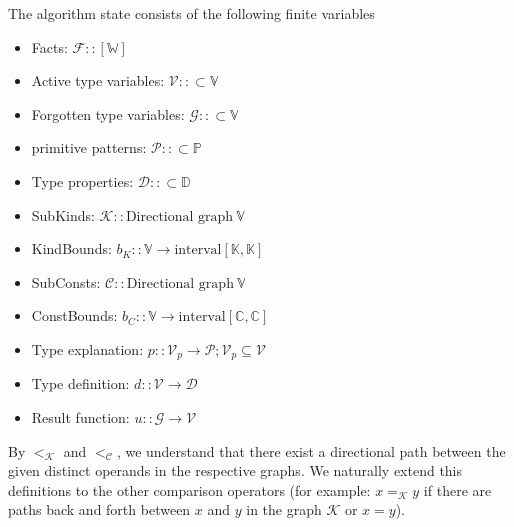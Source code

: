 \begin{defn}
    The algorithm state consists of the following finite variables
    \begin{itemize}
        \item Facts: $\mathcal{F} :: [\mathbb{W}]$
        \item Active type variables: $\mathcal{V} :: \subset \mathbb{V}$
        \item Forgotten type variables: $\mathcal{G} :: \subset \mathbb{V}$
        \item primitive patterns: $\mathcal{P} :: \subset \mathbb{P}$
        \item Type properties: $\mathcal{D} :: \subset \mathbb{D}$
        \item SubKinds: $\mathcal{K} :: \text{Directional graph}\ \mathbb{V}$
        \item KindBounds: $b_K :: \mathbb{V} \to \text{interval} \left[\mathbb{K}, \mathbb{K}\right]$
        \item SubConsts: $\mathcal{C} :: \text{Directional graph}\ \mathbb{V}$
        \item ConstBounds: $b_C :: \mathbb{V} \to \text{interval} \left[\mathbb{C}, \mathbb{C}\right]$
        \item Type explanation: $p :: \mathcal{V}_p \to \mathcal{P}; \mathcal{V}_p \subseteq \mathcal{V}$
        \item Type definition: $d :: \mathcal{V} \to \mathcal{D}$
        \item Result function: $u :: \mathcal{G} \to \mathcal{V}$
    \end{itemize}

    By $<_{\mathcal{K}}$ and $<_{\mathcal{C}}$,
    we understand that there exist a directional path between the given distinct operands in the respective graphs.
    We naturally extend this definitions to the other comparison operators
    (for example: $x =_{\mathcal{K}} y$ if there are paths back and forth between $x$ and $y$ in the graph $\mathcal{K}$ or $x = y$). %

\end{defn}

